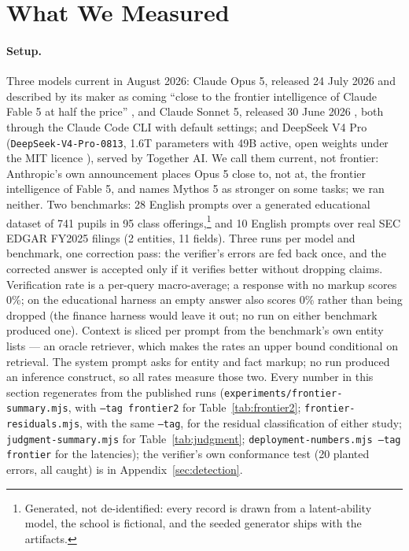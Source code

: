 \documentclass[11pt,a4paper]{article}
\begin{document}
\section{What We Measured}
\label{sec:evaluation}

\paragraph{Setup.} Three models current in August 2026: Claude Opus 5, released 24 July 2026 and described by its maker as coming ``close to the frontier intelligence of Claude Fable 5 at half the price'' \citep{anthropicopus5}, and Claude Sonnet 5, released 30 June 2026 \citep{anthropicsonnet5}, both through the Claude Code CLI with default settings; and DeepSeek V4 Pro (\texttt{DeepSeek-V4-Pro-0813}, 1.6T parameters with 49B active, open weights under the MIT licence \citep{deepseekv4pro}), served by Together AI. We call them current, not frontier: Anthropic's own announcement places Opus 5 close to, not at, the frontier intelligence of Fable 5, and names Mythos 5 as stronger on some tasks; we ran neither. Two benchmarks: 28 English prompts over a generated educational dataset of 741 pupils in 95 class offerings,\footnote{Generated, not de-identified: every record is drawn from a latent-ability model, the school is fictional, and the seeded generator ships with the artifacts.} and 10 English prompts over real SEC EDGAR FY2025 filings (2 entities, 11 fields). Three runs per model and benchmark, one correction pass: the verifier's errors are fed back once, and the corrected answer is accepted only if it verifies better without dropping claims. Verification rate is a per-query macro-average; a response with no markup scores 0\%; on the educational harness an empty answer also scores 0\% rather than being dropped (the finance harness would leave it out; no run on either benchmark produced one). Context is sliced per prompt from the benchmark's own entity lists --- an oracle retriever, which makes the rates an upper bound conditional on retrieval. The system prompt asks for entity and fact markup; no run produced an inference construct, so all rates measure those two. Every number in this section regenerates from the published runs (\texttt{experiments/frontier-summary.mjs}, with \texttt{--tag frontier2} for Table~\ref{tab:frontier2}; \texttt{frontier-residuals.mjs}, with the same \texttt{--tag}, for the residual classification of either study; \texttt{judgment-summary.mjs} for Table~\ref{tab:judgment}; \texttt{deployment-numbers.mjs --tag frontier} for the latencies); the verifier's own conformance test (20 planted errors, all caught) is in Appendix~\ref{sec:detection}.
\end{document}
